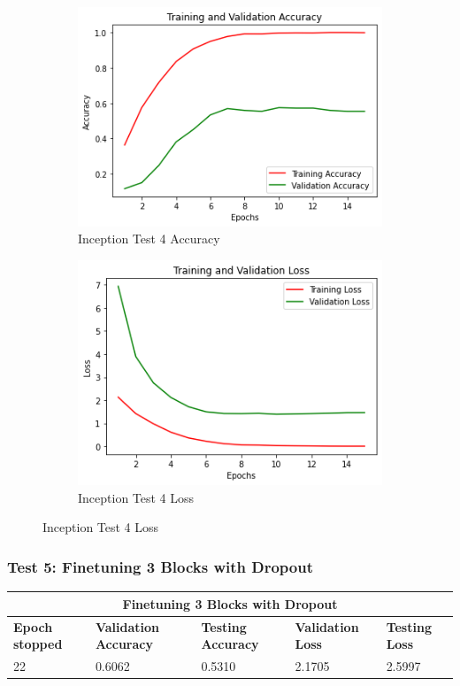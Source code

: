 \begin{figure}[H]
	\begin{subfigure}{0.5\textwidth}
		\includegraphics[width=0.9\linewidth]{img/inception/inceptionft3acc.png} 
		\caption{Inception Test 4 Accuracy}
		\label{fig:inceptionft3acc}
	\end{subfigure}
	\begin{subfigure}{0.5\textwidth}
		\includegraphics[width=0.9\linewidth]{img/inception/inceptionft3loss.png}
		\caption{Inception Test 4 Loss}
		\label{fig:inceptionft3loss}
	\end{subfigure}
\end{figure}

\subsubsection{Test 5: Finetuning 3 Blocks with Dropout}
\begin{tabular}{ |p{2cm}|p{2cm}|p{2cm}|p{2cm}|p{2cm}|  }
\hline
\multicolumn{5}{|c|}{Finetuning 3 Blocks with Dropout} \\
\hline
\textbf{Epoch stopped} & \textbf{Validation Accuracy} & \textbf{Testing Accuracy} & \textbf{Validation Loss} & \textbf{Testing Loss} \\
\hline
22 & 0.6062 & 0.5310 & 2.1705 & 2.5997\\
\hline
\end{tabular}

